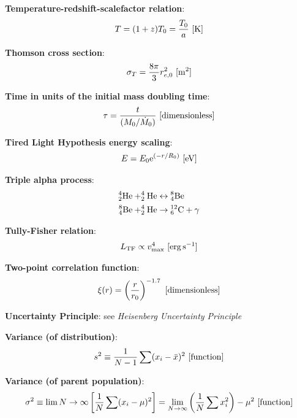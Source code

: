 \documentclass[a4paper,10pt]{article}
\begin{document}
{\noindent}\textbf{Temperature-redshift-scalefactor relation}:
\begin{align*}
    T = (1+z)T_0 = \frac{T_0}{a} ~ [{\rm K}]
\end{align*}

{\noindent}\textbf{Thomson cross section}:
\begin{align*}
\sigma_T = \frac{8\pi}{3}r_{e,0}^2 ~ [{\rm m^2}]
\end{align*}

{\noindent}\textbf{Time in units of the initial mass doubling time}:
\begin{align*}
    \tau = \frac{t}{(M_0/\dot{M}_0)} ~ [{\rm dimensionless}]
\end{align*}

{\noindent}\textbf{Tired Light Hypothesis energy scaling}:
\begin{align*}
    E = E_0 \mathrm{e}^{(-r/R_0)} ~ [{\rm eV}]
\end{align*}

{\noindent}\textbf{Triple alpha process}:
\begin{align*}
    {\rm ^4_2He + ^4_2He} &\leftrightarrow {\rm ^8_4Be} \\
    {\rm ^8_4Be + ^4_2He} &\rightarrow {\rm ^{12}_6C + \gamma}
\end{align*}

{\noindent}\textbf{Tully-Fisher relation}:
\begin{align*}
    L_\mathrm{TF} \propto v_\mathrm{max}^4 ~ [{\rm erg\,s^{-1}}]
\end{align*}

{\noindent}\textbf{Two-point correlation function}:
\begin{align*}
    \xi(r) = \left(\frac{r}{r_0}\right)^{-1.7} ~ [{\rm dimensionless}] 
\end{align*}

{\noindent}\textbf{Uncertainty Principle}: see \textit{Heisenberg Uncertainty Principle}

{\noindent}\textbf{Variance (of distribution)}:
\begin{align*}
    s^2 \equiv \frac{1}{N-1} \sum (x_i-\bar{x})^2 ~ [{\rm function}]
\end{align*}

{\noindent}\textbf{Variance (of parent population)}:
\begin{align*}
    \sigma^2 \equiv \lim{N\rightarrow\infty} \left[\frac{1}{N}\sum(x_i-\mu)^2\right] = \lim_{N\rightarrow\infty} \left(\frac{1}{N}\sum x_i^2\right)-\mu^2 ~ [{\rm function}]
\end{align*}
\end{document}
